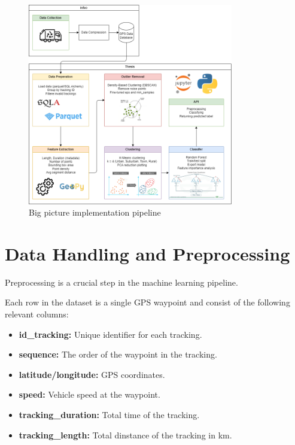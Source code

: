 \documentclass[a4paper,12pt,twoside]{scrreprt}
\begin{document}
\begin{figure}[htbp]
  \centering

  \includegraphics[width=0.8\textwidth]{Diagrams/drawio/big_picture_implementation.png}
  \caption{Big picture implementation pipeline}
  \label{fig:big_picture_implemetation_diagram}
\end{figure}
\FloatBarrier

\section{Data Handling and Preprocessing}
Preprocessing is a crucial step in the machine learning pipeline.

Each row in the dataset is a single GPS waypoint and consist of the following
relevant columns:

\begin{itemize}
  \item \textbf{id\_tracking:} Unique identifier for each tracking.
  \item \textbf{sequence:} The order of the waypoint in the tracking.
  \item \textbf{latitude/longitude:} GPS coordinates.
  \item \textbf{speed:} Vehicle speed at the waypoint.
  \item \textbf{tracking\_duration:} Total time of the tracking.
  \item \textbf{tracking\_length:} Total dinstance of the tracking in km.
\end{itemize}
\end{document}
